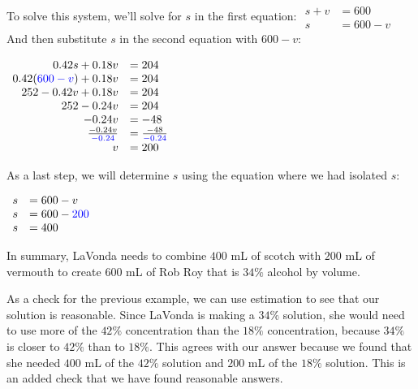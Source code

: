 \documentclass[nooutcomes]{ximera}
\begin{document}
\begin{example}
\begin{explanation}
          To solve this system, we'll solve for $s$ in the first equation:
$
         \begin{array}{rl}
            s+v&=600 \\
            s&=600-v
       \end{array}
$
          And then substitute $s$ in the second equation with $600-v$:
\begin{center}
$
      \begin{array}{rl}
            0.42s+0.18v&=204 \\
            0.42({\color{blue}{{600-v}}})+0.18v&=204\\
            252-0.42v+0.18v&=204\\
            252-0.24v&=204\\
            -0.24v&=-48\\
            \frac{-0.24v}{{\color{blue}{{-0.24}}}}&=\frac{-48}{{\color{blue}{{-0.24}}}}\\
            v&=200
       \end{array}
$
\end{center}
          As a last step,
          we will determine $s$ using the equation where we had isolated $s$:
\begin{center}          
$
\begin{array}{rl}
            s&=600-v\\
            s&=600-{\color{blue}{{200}}}\\
            s&=400
       \end{array}
$
\end{center}
          In summary, LaVonda needs to combine
$400$ mL
          of scotch with
       $200$ mL
          of vermouth to create
   $600$ mL
          of Rob Roy that is $34\%$ alcohol by volume.
\end{explanation}
\end{example}

    
      As a check for the previous example,
      we can use estimation
      to see that our solution is reasonable.
      Since LaVonda is making a $34\%$ solution,
      she would need to use more of the $42\%$ concentration than the $18\%$ concentration,
      because $34\%$ is closer to $42\%$ than to $18\%$.
      This agrees with our answer because we found that she needed
  $400$ mL
      of the $42\%$ solution and $200$ mL
      of the $18\%$ solution.
      This is an added check that we have found reasonable answers.
\end{document}
